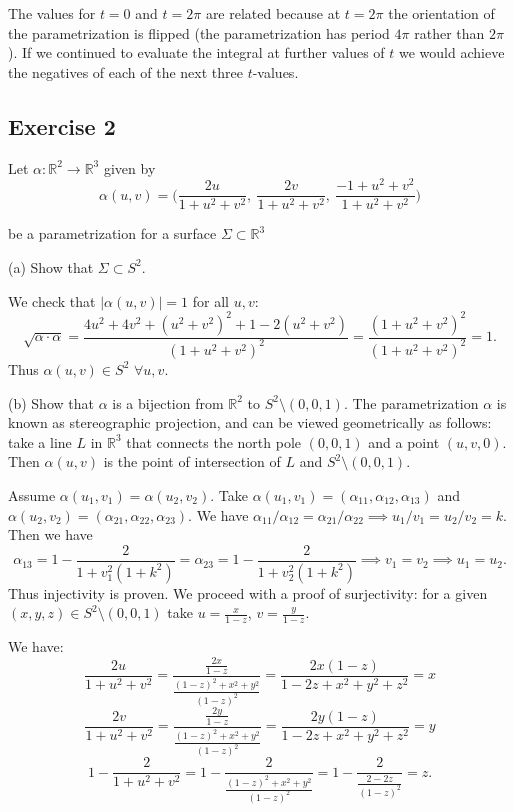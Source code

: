 \documentclass{amsart}
\begin{document}
\medskip \noindent The values for $t=0$ and $t=2\pi$ are related because at $t=2\pi$ the orientation of the parametrization
is flipped (the parametrization has period $4\pi$ rather than $2\pi$). If we continued to evaluate
the integral at further values of $t$ we would achieve the negatives of each of the next three $t$-values. 

\bigskip

\subsection*{Exercise 2} Let $\alpha:\mathbb{R}^2\rightarrow\mathbb{R}^3$ given by
\begin{equation*}
\alpha(u,v)=\bigg(\frac{2u}{1+u^2+v^2},\:\frac{2v}{1+u^2+v^2},\:\frac{-1+u^2+v^2}{1+u^2+v^2}\bigg)
\end{equation*}

\noindent be a parametrization for a surface $\Sigma\subset\mathbb{R}^3$

(a) Show that $\Sigma\subset S^2$.

\medskip \noindent We check that $|\alpha(u,v)|=1$ for all $u,v$:
\[\sqrt{\alpha\cdot\alpha}=\frac{4u^2+4v^2+(u^2+v^2)^2+1-2(u^2+v^2)}{(1+u^2+v^2)^2}=\frac{(1+u^2+v^2)^2}{(1+u^2+v^2)^2}=1.\]
Thus $\alpha(u,v)\in S^2$ $\forall u,v$.


\bigskip

(b) Show that $\alpha$ is a bijection from $\mathbb{R}^2$ to $S^2\setminus(0,0,1)$. The parametrization $\alpha$ is known as stereographic projection, and can be viewed geometrically as follows: take a line $L$ in $\mathbb{R}^3$ that connects the north pole $(0,0,1)$ and a point $(u,v,0)$. Then $\alpha(u,v)$ is the point of intersection of $L$ and $S^2\setminus(0,0,1)$.

\medskip \noindent Assume $\alpha(u_1, v_1)=\alpha(u_2, v_2).$ Take $\alpha(u_1,v_1)=(\alpha_{11},\alpha_{12},\alpha_{13})$
and $\alpha(u_2, v_2)=(\alpha_{21},\alpha_{22},\alpha_{23}).$ We have $\alpha_{11}/\alpha_{12}=\alpha_{21}/\alpha_{22}\implies u_1/v_1=u_2/v_2=k$.
Then we have \[\alpha_{13}=1-\frac{2}{1+v_1^2(1+k^2)}=\alpha_{23}=1-\frac{2}{1+v_2^2(1+k^2)}\implies v_1=v_2\implies u_1=u_2.\]
Thus injectivity is proven. We proceed with a proof of surjectivity: for a given $(x,y,z)\in S^2\setminus(0,0,1)$ take 
$u=\frac{x}{1-z}$, $v=\frac{y}{1-z}$.

\medskip \noindent We have:
\[\frac{2u}{1+u^2+v^2}=\frac{\frac{2x}{1-z}}{\frac{(1-z)^2+x^2+y^2}{(1-z)^2}}=\frac{2x(1-z)}{1-2z+x^2+y^2+z^2}=x\]
\[\frac{2v}{1+u^2+v^2}=\frac{\frac{2y}{1-z}}{\frac{(1-z)^2+x^2+y^2}{(1-z)^2}}=\frac{2y(1-z)}{1-2z+x^2+y^2+z^2}=y\]
\[1-\frac{2}{1+u^2+v^2}=1-\frac{2}{\frac{(1-z)^2+x^2+y^2}{(1-z)^2}}=1-\frac{2}{\frac{2-2z}{(1-z)^2}}=z.\]
\end{document}
